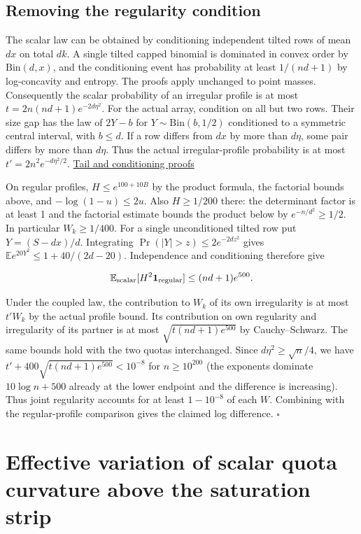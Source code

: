 \documentclass[11pt]{article}
\begin{document}
\subsection{Removing the regularity condition}

The scalar law can be obtained by conditioning independent tilted rows of mean $dx$ on total $dk$. A single tilted capped binomial is dominated in convex order by $\mathrm{Bin}(d,x)$, and the conditioning event has probability at least $1/(nd+1)$ by log-concavity and entropy. The proofs apply unchanged to point masses. Consequently the scalar probability of an irregular profile is at most $t=2n(nd+1)e^{-2d\eta^2}$. For the actual array, condition on all but two rows. Their size gap has the law of $2Y-b$ for $Y\sim\mathrm{Bin}(b,1/2)$ conditioned to a symmetric central interval, with $b\le d$. If a row differs from $dx$ by more than $d\eta$, some pair differs by more than $d\eta$. Thus the actual irregular-profile probability is at most $t'=2n^2e^{-d\eta^2/2}$. \href{https://github.com/ProgramComputer/open-math-research/blob/main/topics/balanced-arrays/dense-regime/quantitative-margins.md}{Tail and conditioning proofs}

On regular profiles, $H\le e^{100+10B}$ by the product formula, the factorial bounds above, and $-\log(1-u)\le2u$. Also $H\ge1/200$ there: the determinant factor is at least 1 and the factorial estimate bounds the product below by $e^{-n/d^2}\ge1/2$. In particular $W_k\ge1/400$. For a single unconditioned tilted row put $Y=(S-dx)/d$. Integrating $\Pr(|Y|>z)\le 2e^{-2dz^2}$ gives $\mathbb E e^{20Y^2}\le1+40/(2d-20)$. Independence and conditioning therefore give

\[
\mathbb E_{\rm scalar}[H^2\mathbf1_{\rm regular}]\le (nd+1)e^{500}.
\]

Under the coupled law, the contribution to $W_k$ of its own irregularity is at most $t'W_k$ by the actual profile bound. Its contribution on own regularity and irregularity of its partner is at most $\sqrt{t(nd+1)e^{500}}$ by Cauchy--Schwarz. The same bounds hold with the two quotas interchanged. Since $d\eta^2\ge\sqrt n/4$, we have $t'+400\sqrt{t(nd+1)e^{500}}<10^{-8}$ for $n\ge10^{200}$ (the exponents dominate $10\log n+500$ already at the lower endpoint and the difference is increasing). Thus joint regularity accounts for at least $1-10^{-8}$ of each $W$. Combining with the regular-profile comparison gives the claimed log difference. $\square$

\section{Effective variation of scalar quota curvature above the saturation strip}
\end{document}
